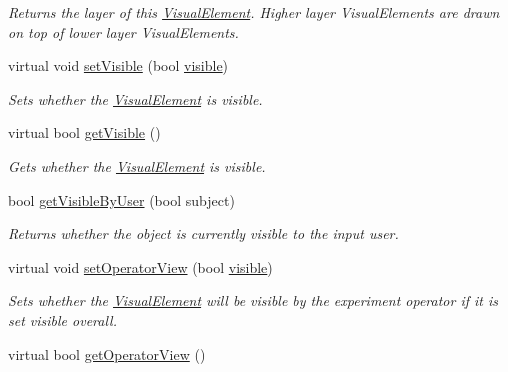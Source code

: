 \begin{DoxyCompactItemize}
\begin{DoxyCompactList}\small\item\em Returns the layer of this \hyperlink{struct_picto_1_1_visual_element}{Visual\-Element}. Higher layer Visual\-Elements are drawn on top of lower layer Visual\-Elements. \end{DoxyCompactList}\item 
virtual void \hyperlink{struct_picto_1_1_visual_element_ad109197a3a4da914199b404da058e1ed}{set\-Visible} (bool \hyperlink{struct_picto_1_1_visual_element_a81a6de4e406cc6e3d8c7ac6398334d6c}{visible})
\begin{DoxyCompactList}\small\item\em Sets whether the \hyperlink{struct_picto_1_1_visual_element}{Visual\-Element} is visible. \end{DoxyCompactList}\item 
virtual bool \hyperlink{struct_picto_1_1_visual_element_a3645b3e5193ca69ba743917b917846f1}{get\-Visible} ()
\begin{DoxyCompactList}\small\item\em Gets whether the \hyperlink{struct_picto_1_1_visual_element}{Visual\-Element} is visible. \end{DoxyCompactList}\item 
bool \hyperlink{struct_picto_1_1_visual_element_a1f754b7bf730f6d77f2678687c9aeb04}{get\-Visible\-By\-User} (bool subject)
\begin{DoxyCompactList}\small\item\em Returns whether the object is currently visible to the input user. \end{DoxyCompactList}\item 
\hypertarget{struct_picto_1_1_visual_element_a2e3af5ff674a35353a2f4da14a676b4a}{virtual void \hyperlink{struct_picto_1_1_visual_element_a2e3af5ff674a35353a2f4da14a676b4a}{set\-Operator\-View} (bool \hyperlink{struct_picto_1_1_visual_element_a81a6de4e406cc6e3d8c7ac6398334d6c}{visible})}\label{struct_picto_1_1_visual_element_a2e3af5ff674a35353a2f4da14a676b4a}

\begin{DoxyCompactList}\small\item\em Sets whether the \hyperlink{struct_picto_1_1_visual_element}{Visual\-Element} will be visible by the experiment operator if it is set visible overall. \end{DoxyCompactList}\item 
\hypertarget{struct_picto_1_1_visual_element_a1563dae2a604aff0f330c7c50acf8e14}{virtual bool \hyperlink{struct_picto_1_1_visual_element_a1563dae2a604aff0f330c7c50acf8e14}{get\-Operator\-View} ()}\label{struct_picto_1_1_visual_element_a1563dae2a604aff0f330c7c50acf8e14}


\end{DoxyCompactItemize}
